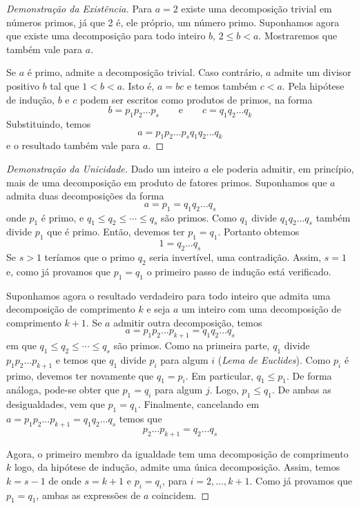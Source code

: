 \documentclass[fleqn]{icat-ufal}
\begin{document}
\begin{proof}[Demonstração da Existência]
    Para $a=2$ existe uma decomposição trivial em números primos, já que 2 é, ele
    próprio, um número primo. Suponhamos agora que existe uma decomposição para
    todo inteiro $b$, $2\leq b<a$. Mostraremos que também vale para $a$. 
    
    Se $a$ é primo, admite a decomposição trivial. Caso contrário, $a$ admite um
    divisor positivo $b$ tal que $1<b<a$. Isto é, $a=bc$ e temos também $c<a$.
    Pela hipótese de indução, $b$ e $c$ podem ser escritos como produtos de
    primos, na forma
    \[ b=p_1 p_2 \dots p_s \qquad \text{e} \qquad c=q_1 q_2 \dots q_k \]
    Substituindo, temos 
    \[ a=p_1 p_2 \dots p_s q_1 q_2 \dots q_k \]
    e o resultado também vale para $a$.
\end{proof}

\begin{proof}[Demonstração da Unicidade]
    Dado um inteiro $a$ ele poderia admitir, em princípio, mais de uma
    decomposição em produto de fatores primos. Suponhamos que $a$ admita duas
    decomposições da forma 
    \[ a = p_1 = q_1 q_2 \dots q_s\]
    onde $p_1$ é primo, e $q_1 \leq q_2 \leq \cdots \leq q_s$ são primos. Como
    $q_1$ divide $q_1 q_2 \dots q_s$ também divide $p_1$ que é primo. Então,
    devemos ter $p_1=q_1$. Portanto obtemos
    \[ 1 = q_2 \dots q_s \]
    Se $s>1$ teríamos que o primo $q_2$ seria invertível, uma contradição. Assim,
    $s=1$ e, como já provamos que $p_1=q_1$ o primeiro passo de indução está
    verificado.
    
    Suponhamos agora o resultado verdadeiro para todo inteiro que admita uma
    decomposição de comprimento $k$ e seja $a$ um inteiro com uma decomposição de
    comprimento $k+1$. Se $a$ admitir outra decomposição, temos 
    \[ a = p_1 p_2 \dots  p_{k+1} = q_1 q_2 \dots q_s\]
    em que  $q_1 \leq q_2 \leq \cdots \leq q_s$ são primos. Como na primeira
    parte, $q_1$ divide $p_1 p_2 \dots p_{k+1}$ e temos que $q_1$ divide $p_i$
    para algum $i$ (\textit{Lema de Euclides}). Como $p_i$ é primo, devemos ter
    novamente que $q_1=p_i$. Em particular, $q_1 \leq p_1$. De forma análoga,
    pode-se obter que $p_1=q_i$ para algum $j$. Logo, $p_1 \leq q_1$. De ambas as
    desigualdades, vem que $p_1=q_1$. Finalmente, cancelando em 
    ${a = p_1 p_2 \dots p_{k+1} = q_1 q_2 \dots q_s}$
    temos que 
    \[ p_2 \dots p_{k+1} = q_2 \dots q_s\]
    
    Agora, o primeiro membro da igualdade tem uma decomposição de comprimento $k$
    logo, da hipótese de indução, admite uma única decomposição. Assim, temos
    $k=s-1$ de onde $s=k+1$ e $p_i=q_i$, para $i=2,\dots,k+1$. Como já provamos
    que $p_1=q_1$, ambas as expressões de $a$ coincidem. 
\end{proof}
\end{document}
